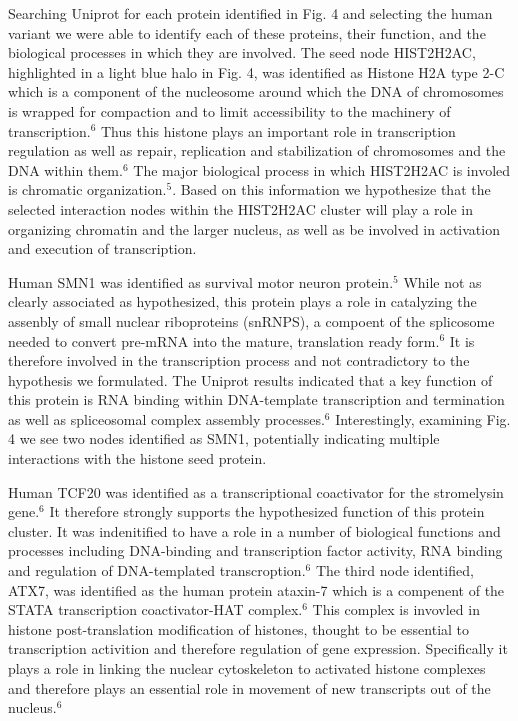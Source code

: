 \documentclass[letterpaper, 10 pt, conference]{ieeeconf}  %
\begin{document}
Searching Uniprot for each protein identified in Fig. 4 and selecting the human variant we were able to identify each of these proteins, their function, and the biological processes in which they are involved. The seed node HIST2H2AC, highlighted in a light blue halo in Fig. 4, was identified as Histone H2A type 2-C which is a component of the nucleosome around which the DNA of chromosomes is wrapped for compaction and to limit accessibility to the machinery of transcription.$^6$ Thus this histone plays an important role in transcription regulation as well as repair, replication and stabilization of chromosomes and the DNA within them.$^6$ The major biological process in which HIST2H2AC is involed is chromatic organization.$^5$. Based on this information we hypothesize that the selected interaction nodes within the HIST2H2AC cluster will play a role in organizing chromatin and the larger nucleus, as well as be involved in activation and execution of transcription.

Human SMN1 was identified as survival motor neuron protein.$^5$ While not as clearly associated as hypothesized, this protein plays a role in catalyzing the assenbly of small nuclear riboproteins (snRNPS), a compoent of the splicosome needed to convert pre-mRNA into the mature, translation ready form.$^6$ It is therefore involved in the transcription process and not contradictory to the hypothesis we formulated. The Uniprot results indicated that a key function of this protein is RNA binding within DNA-template transcription and termination as well as spliceosomal complex assembly processes.$^6$ Interestingly, examining Fig. 4 we see two nodes identified as SMN1, potentially indicating multiple interactions with the histone seed protein.

Human TCF20 was identified as a transcriptional coactivator for the stromelysin gene.$^6$ It therefore strongly supports the hypothesized function of this protein cluster. It was indenitified to have a role in a number of biological functions and processes including DNA-binding and transcription factor activity, RNA binding and regulation of DNA-templated transcroption.$^6$ The third node identified, ATX7, was identified as the human protein ataxin-7 which is a compenent of the STATA transcription coactivator-HAT complex.$^6$ This complex is invovled in histone post-translation modification of histones, thought to be essential to transcription activition and therefore regulation of gene expression. Specifically it plays a role in linking the nuclear cytoskeleton to activated histone complexes and therefore plays an essential role in movement of new transcripts out of the nucleus.$^6$
\end{document}
